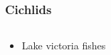 \documentclass[aspectratio=169]{beamer}
\begin{document}
\begin{frame}
	\frametitle{Cichlids}
	\begin{columns}
		\begin{column}{0.495\linewidth}
			\begin{itemize}
				\item Lake victoria fishes
			\end{itemize}
		\end{column}
		\begin{column}{0.495\linewidth}
%
		\end{column}
	\end{columns}
\end{frame}
\end{document}

